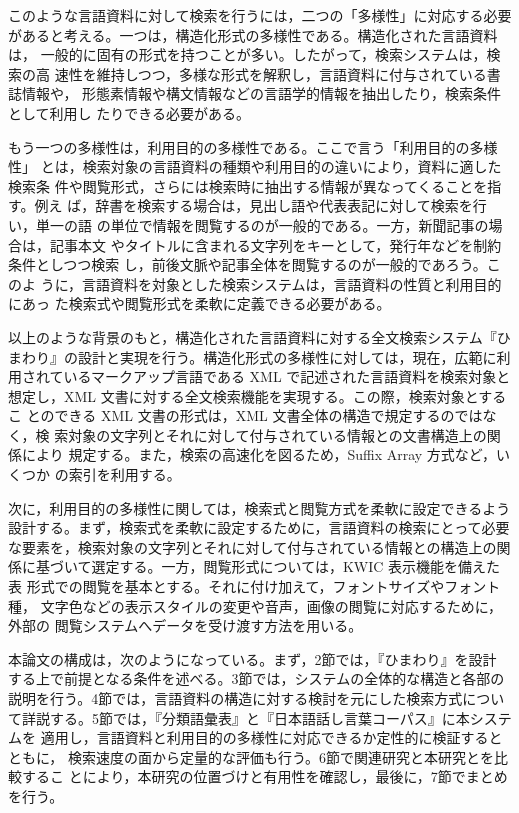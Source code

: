 このような言語資料に対して検索を行うには，二つの「多様性」に対応する必要
があると考える。一つは，構造化形式の多様性である。構造化された言語資料は，
一般的に固有の形式を持つことが多い。したがって，検索システムは，検索の高
速性を維持しつつ，多様な形式を解釈し，言語資料に付与されている書誌情報や，
形態素情報や構文情報などの言語学的情報を抽出したり，検索条件として利用し
たりできる必要がある。

もう一つの多様性は，利用目的の多様性である。ここで言う「利用目的の多様性」
とは，検索対象の言語資料の種類や利用目的の違いにより，資料に適した検索条
件や閲覧形式，さらには検索時に抽出する情報が異なってくることを指す。例え
ば，辞書を検索する場合は，見出し語や代表表記に対して検索を行い，単一の語
の単位で情報を閲覧するのが一般的である。一方，新聞記事の場合は，記事本文
やタイトルに含まれる文字列をキーとして，発行年などを制約条件としつつ検索
し，前後文脈や記事全体を閲覧するのが一般的であろう。このよ
うに，言語資料を対象とした検索システムは，言語資料の性質と利用目的にあっ
た検索式や閲覧形式を柔軟に定義できる必要がある。

以上のような背景のもと，構造化された言語資料に対する全文検索システム『ひ
まわり』の設計と実現を行う。構造化形式の多様性に対しては，現在，広範に利
用されているマークアップ言語である XML で記述された言語資料を検索対象と
想定し，XML 文書に対する全文検索機能を実現する。この際，検索対象とするこ
とのできる XML 文書の形式は，XML 文書全体の構造で規定するのではなく，検
索対象の文字列とそれに対して付与されている情報との文書構造上の関係により
規定する。また，検索の高速化を図るため，Suffix Array 方式など，いくつか
の索引を利用する。

次に，利用目的の多様性に関しては，検索式と閲覧方式を柔軟に設定できるよう
設計する。まず，検索式を柔軟に設定するために，言語資料の検索にとって必要
な要素を，検索対象の文字列とそれに対して付与されている情報との構造上の関
係に基づいて選定する。一方，閲覧形式については，KWIC 表示機能を備えた表
形式での閲覧を基本とする。それに付け加えて，フォントサイズやフォント種，
文字色などの表示スタイルの変更や音声，画像の閲覧に対応するために，外部の
閲覧システムへデータを受け渡す方法を用いる。

本論文の構成は，次のようになっている。まず，2節では，『ひまわり』を設計
する上で前提となる条件を述べる。3節では，システムの全体的な構造と各部の
説明を行う。4節では，言語資料の構造に対する検討を元にした検索方式につい
て詳説する。5節では，『分類語彙表』と『日本語話し言葉コーパス』に本システムを
適用し，言語資料と利用目的の多様性に対応できるか定性的に検証するとともに，
検索速度の面から定量的な評価も行う。6節で関連研究と本研究とを比較するこ
とにより，本研究の位置づけと有用性を確認し，最後に，7節でまとめを行う。





